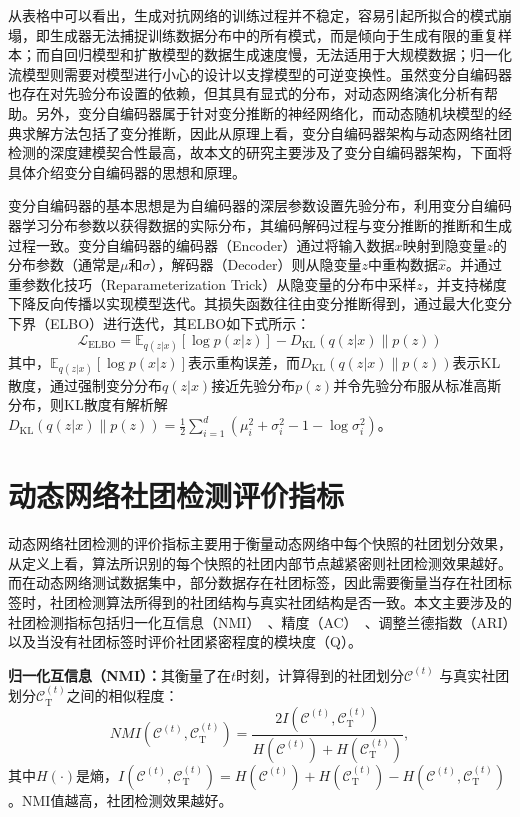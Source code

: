从表格中可以看出，生成对抗网络的训练过程并不稳定，容易引起所拟合的模式崩塌，即生成器无法捕捉训练数据分布中的所有模式，而是倾向于生成有限的重复样本；而自回归模型和扩散模型的数据生成速度慢，无法适用于大规模数据；归一化流模型则需要对模型进行小心的设计以支撑模型的可逆变换性。虽然变分自编码器也存在对先验分布设置的依赖，但其具有显式的分布，对动态网络演化分析有帮助。另外，变分自编码器属于针对变分推断的神经网络化，而动态随机块模型的经典求解方法包括了变分推断，因此从原理上看，变分自编码器架构与动态网络社团检测的深度建模契合性最高，故本文的研究主要涉及了变分自编码器架构，下面将具体介绍变分自编码器的思想和原理。

变分自编码器的基本思想是为自编码器的深层参数设置先验分布，利用变分自编码器学习分布参数以获得数据的实际分布，其编码解码过程与变分推断的推断和生成过程一致。变分自编码器的编码器（Encoder）通过将输入数据$x$映射到隐变量$z$的分布参数（通常是$\mu$和$\sigma$），解码器（Decoder）则从隐变量$z$中重构数据$\hat{x}$。并通过重参数化技巧（Reparameterization Trick）从隐变量的分布中采样$z$，并支持梯度下降反向传播以实现模型迭代。其损失函数往往由变分推断得到，通过最大化变分下界（ELBO）进行迭代，其ELBO如下式所示：
\begin{equation}
	\mathcal{L}_{\text{ELBO}} = \mathbb{E}_{q(z|x)}[\log p(x|z)] - D_{\text{KL}}(q(z|x) \| p(z))
\end{equation}
其中，$\mathbb{E}_{q(z|x)}[\log p(x|z)]$表示重构误差，而$D_{\text{KL}}(q(z|x) \| p(z))$表示KL散度，通过强制变分分布$q(z|x)$接近先验分布$p(z)$并令先验分布服从标准高斯分布，则KL散度有解析解$D_{\text{KL}}(q(z|x) \| p(z))=\frac{1}{2}\sum_{i=1}^{d}(\mu_i^2+\sigma_i^2-1-\log \sigma_i^2)$。

\section{动态网络社团检测评价指标}
\label{chap2:metrics}
动态网络社团检测的评价指标主要用于衡量动态网络中每个快照的社团划分效果，从定义上看，算法所识别的每个快照的社团内部节点越紧密则社团检测效果越好。而在动态网络测试数据集中，部分数据存在社团标签，因此需要衡量当存在社团标签时，社团检测算法所得到的社团结构与真实社团结构是否一致。本文主要涉及的社团检测指标包括归一化互信息（NMI）~\cite{gong2007machine}、精度（AC）~\cite{folino2013evolutionary}、调整兰德指数（ARI）以及当没有社团标签时评价社团紧密程度的模块度（Q）。

\textbf{归一化互信息（NMI）：}其衡量了在$t$时刻，计算得到的社团划分$\mathcal{C}^{(t)}$ 与真实社团划分$\mathcal{C}_{\mathrm{T}}^{(t)}$之间的相似程度：
     \begin{equation}
          NMI(\mathcal{C}^{(t)},\mathcal{C}_{\mathrm{T}}^{(t)})= \frac{2I(\mathcal{C}^{(t)},\mathcal{C}_{\mathrm{T}}^{(t)})}{H(\mathcal{C}^{(t)})+H(\mathcal{C}_{\mathrm{T}}^{(t)})},
      \end{equation}
其中$H(\cdot)$是熵，$I(\mathcal{C}^{(t)},\mathcal{C}_{\mathrm{T}}^{(t)}) = H(\mathcal{C}^{(t)})+H(\mathcal{C}_{\mathrm{T}}^{(t)}) - H(\mathcal{C}^{(t)},\mathcal{C}_{\mathrm{T}}^{(t)})$。NMI值越高，社团检测效果越好。

